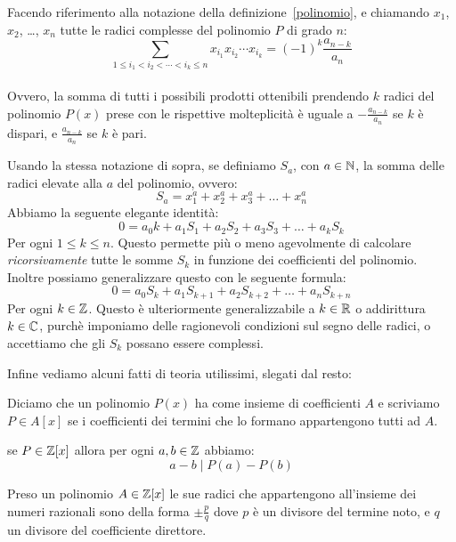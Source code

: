 \documentclass[11pt]{scrartcl}
\begin{document}
	\begin{theorem}[Viète] 
		Facendo riferimento alla notazione della definizione~\ref{polinomio}, e chiamando $x_1$, $x_2$, \dots, $x_n$ tutte le radici complesse del polinomio $P$ di grado $n$: 
		$$\sum_{1\le i_1 < i_2 < \cdots < i_k\le n} x_{i_1}x_{i_2}\cdots x_{i_k}=(-1)^k\frac{a_{n-k}}{a_n}$$
		\\ Ovvero, la somma di tutti i possibili prodotti ottenibili prendendo $k$ radici del polinomio $P(x)$ prese con le rispettive molteplicità è uguale a $-\frac{a_{n-k}}{a_n}$ se $k$ è dispari, e $\frac{a_{n-k}}{a_n}$ se $k$ è pari.
		
	\end{theorem}
	\begin{theorem} 
		Usando la stessa notazione di sopra, se definiamo $S_a$, con $a\in\mathbb N$, la somma delle radici elevate alla $a$ del polinomio, ovvero:
		$$S_a=x_1^a+x_2^a+x_3^a+\dots+x_n^a$$
		Abbiamo la seguente elegante identità:
		$$0=a_0k+a_1S_1+a_2S_2+a_3S_3+\dots+a_kS_k$$
		Per ogni $1\le k \le n$.
		Questo permette più o meno agevolmente di calcolare \textit{ricorsivamente} tutte le somme $S_k$ in funzione dei coefficienti del polinomio.
		\\
		Inoltre possiamo generalizzare questo con le seguente formula:
		$$0=a_0S_k+a_1S_{k+1}+a_2S_{k+2}+\dots+a_nS_{k+n}$$
		Per ogni $k \in \mathbb Z$. Questo è ulteriormente generalizzabile a $k \in \mathbb R$ o addirittura $k \in \mathbb C$, purchè imponiamo delle ragionevoli condizioni sul segno delle radici, o accettiamo che gli $S_k$ possano essere complessi.
	\end{theorem}
	Infine vediamo alcuni fatti di teoria utilissimi, slegati dal resto:
	\begin{definition}
		Diciamo che un polinomio $P(x)$ ha come insieme di coefficienti $A$ e scriviamo $P \in A[x]$ se i coefficienti dei termini che lo formano appartengono tutti ad $A$.
	\end{definition}
	\begin{theorem}
		se $P \in \mathbb Z[x]$ allora per ogni $a,b\in\mathbb Z$ abbiamo:
		$$a-b \mid P(a)-P(b)$$
	\end{theorem}
	\begin{theorem}
		Preso un polinomio $A \in \mathbb Z[x]$ le sue radici che appartengono all'insieme dei numeri razionali sono della forma $\pm\frac{p}{q}$ dove $p$ è un divisore del termine noto, e $q$ un divisore del coefficiente direttore.
	\end{theorem}
	
\end{document}
